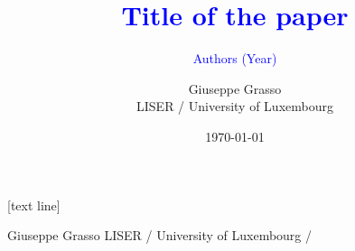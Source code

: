 


\title[]{\textcolor{blue}{Title of the paper} \\[0.5em]}
\subtitle[]{\textcolor{blue}{Authors (Year)} \\[1em] }
\author[G. Grasso]{Giuseppe Grasso \\[0.5em] \scriptsize{LISER / University of Luxembourg}}
\date{\today}

[text line]{%
  \parbox{\linewidth}{\scriptsize{ \vspace*{-15pt}Giuseppe Grasso \hfill LISER / University of Luxembourg \hfill\insertframenumber/\inserttotalframenumber}}}





